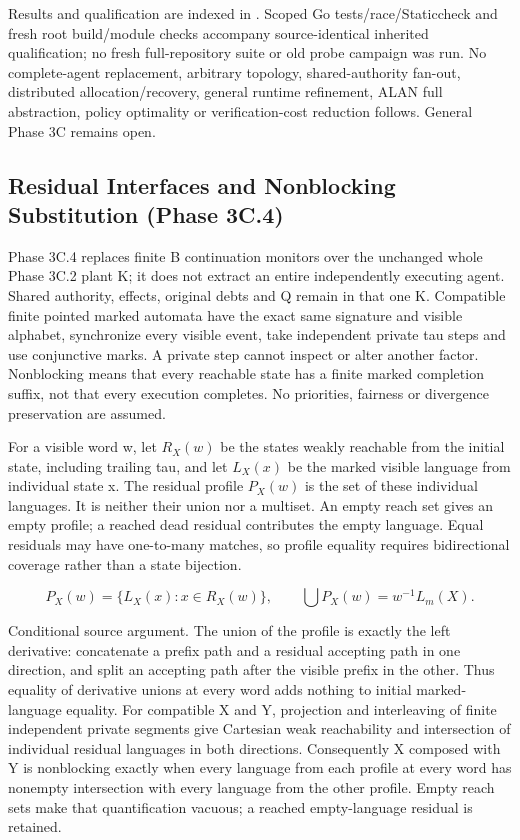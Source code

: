 \documentclass[11pt,a4paper]{article}
\theoremstyle{definition}
\theoremstyle{remark}
\begin{document}
Results and qualification are indexed in . Scoped Go tests/race/Staticcheck and fresh root build/module checks accompany source-identical inherited qualification; no fresh full-repository suite or old probe campaign was run. No complete-agent replacement, arbitrary topology, shared-authority fan-out, distributed allocation/recovery, general runtime refinement, ALAN full abstraction, policy optimality or verification-cost reduction follows. General Phase 3C remains open.

\subsection{Residual Interfaces and Nonblocking Substitution (Phase 3C.4)}

Phase 3C.4 replaces finite B continuation monitors over the unchanged whole Phase 3C.2 plant K; it does not extract an entire independently executing agent. Shared authority, effects, original debts and Q remain in that one K. Compatible finite pointed marked automata have the exact same signature and visible alphabet, synchronize every visible event, take independent private tau steps and use conjunctive marks. A private step cannot inspect or alter another factor. Nonblocking means that every reachable state has a finite marked completion suffix, not that every execution completes. No priorities, fairness or divergence preservation are assumed.

For a visible word w, let $R_X(w)$ be the states weakly reachable from the initial state, including trailing tau, and let $L_X(x)$ be the marked visible language from individual state x. The residual profile $P_X(w)$ is the set of these individual languages. It is neither their union nor a multiset. An empty reach set gives an empty profile; a reached dead residual contributes the empty language. Equal residuals may have one-to-many matches, so profile equality requires bidirectional coverage rather than a state bijection.

\[
P_X(w)=\{L_X(x):x\in R_X(w)\},\qquad
\bigcup P_X(w)=w^{-1}L_m(X).
\]

Conditional source argument. The union of the profile is exactly the left derivative: concatenate a prefix path and a residual accepting path in one direction, and split an accepting path after the visible prefix in the other. Thus equality of derivative unions at every word adds nothing to initial marked-language equality. For compatible X and Y, projection and interleaving of finite independent private segments give Cartesian weak reachability and intersection of individual residual languages in both directions. Consequently X composed with Y is nonblocking exactly when every language from each profile at every word has nonempty intersection with every language from the other profile. Empty reach sets make that quantification vacuous; a reached empty-language residual is retained.
\end{document}
